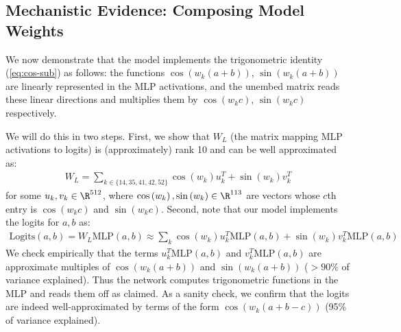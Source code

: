 \documentclass{article} %
\newcommand{\cosp}[1]{\cos \left ( #1 \right )}
\newcommand{\sinp}[1]{\sin \left ( #1 \right )}
\newcommand{\keyfreqs}{\{14, 35, 41, 42, 52\}}
\newcommand{\MLP}{\textrm{MLP}}
\begin{document}
\subsection{Mechanistic Evidence: Composing Model Weights}
\label{sec:mechanistic}

We now demonstrate that the model implements the trigonometric identity (\ref{eq:cos-sub})
as follows: the functions $\cosp{w_k (a+b)}$, $\sinp{w_k (a+b)}$ are linearly represented in the MLP activations, and the unembed matrix reads these linear directions and multiplies them by $\cosp{w_k c}$,  $\sinp{w_k c}$ respectively.

We will do this in two steps. First, we show that $W_L$ (the matrix mapping MLP activations to logits) is (approximately) rank 10 and can be well approximated as:
\begin{align}
    W_L = {\sum}_{k \in \keyfreqs} \cosp{w_k} u_k^T + \sinp{w_k} v_k ^T
\end{align}
for some $u_k, v_k \in \R^{512}$, where $\cosp{w_k}, \sinp{w_k} \in \R^{113}$ are vectors whose $c$th entry is $\cosp{w_k c}$ and $\sinp{w_k c}$.  Second, note that our model implements the logits for $a, b$ as:
\begin{align}
    \textrm{Logits}(a,b) = W_L \MLP(a, b)  \approx  {\sum}_{k}  \cosp{w_k} u_k^T \MLP(a, b) + \sinp{w_k} v_k^T \MLP(a,b) 
\end{align}   
 We check empirically that the terms $u_k^T \MLP(a,b)$ and $v_k^T \MLP(a,b)$ are approximate multiples of $\cosp{w_k(a+b)}$ and $\sinp{w_k (a+b)}$ ($>\!90\%$ of variance explained). Thus the network computes trigonometric functions in the MLP and reads them off as claimed. As a sanity check, we confirm that the logits are indeed well-approximated by terms of the form $\cosp{w_k (a+b-c)}$ (95\% of variance explained).

\end{document}
